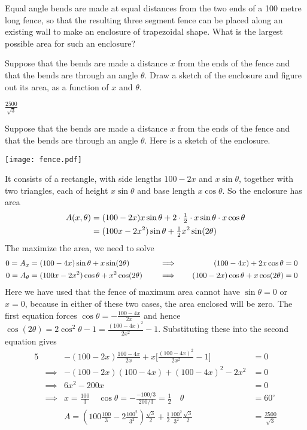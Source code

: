 \begin{question}
Equal angle bends are made at equal distances from the two ends of a
100 metre long fence, so that the resulting three segment fence can be placed
along an existing wall to make an enclosure of trapezoidal shape. What
is the largest possible area for such an enclosure?
\end{question}

\begin{hint}
Suppose that the bends are made a  distance $x$ from the ends of the fence
and that the bends are through an angle $\theta$. Draw a sketch of the
enclosure and figure out its area, as a function of $x$ and $\theta$.
\end{hint}

\begin{answer}
$\frac{2500}{\sqrt{3}}$
\end{answer}

\begin{solution}
Suppose that the bends are made a  distance $x$ from the ends of the fence
and that the bends are through an angle $\theta$.
Here is a sketch of the enclosure.
\begin{center}
     \texttt{[image: fence.pdf]}
\end{center}
It consists of a rectangle, with side lengths $100-2x$ and
$x\sin\theta$, together with two triangles, each of height $x\sin\theta$
and base length $x\cos\theta$. So the enclosure has area
\begin{align*}
A(x,\theta)&=(100-2x)x\sin\theta+2\cdot\tfrac{1}{2}\cdot x\sin\theta\cdot x\cos\theta\\
&=(100x-2x^2)\sin\theta+\tfrac{1}{2} x^2\sin(2\theta)
\end{align*}
The maximize the area, we need to solve
\begin{alignat*}{5}
0=A_x&=(100-4x)\sin\theta+x\sin(2\theta) & &\implies &
(100-4x)+2x\cos\theta&=0\cr
0=A_\theta&=(100x-2x^2)\cos\theta+x^2\cos(2\theta)\quad & &\implies\quad &
(100-2x)\cos\theta+x\cos(2\theta)&=0
\end{alignat*}
Here we have used that the fence of maximum area cannot have $\sin\theta=0$
or $x=0$, because in either of these two cases, the area enclosed will be zero. 
The first equation forces $\cos\theta=-\frac{100-4x}{2x}$
and hence $\cos(2\theta)=2\cos^2\theta-1=\frac{(100-4x)^2}{2x^2}-1$. 
Substituting these into the second equation gives
\begin{alignat*}{5}
& & -(100-2x)\frac{100-4x}{2x}+x\Big[\frac{(100-4x)^2}{2x^2}-1\Big]&=0 \\
&\implies & -(100-2x)(100-4x)+(100-4x)^2-2x^2&=0 \\
&\implies & 6x^2-200x&=0 \\
&\implies & x=\frac{100}{3}
\quad\cos\theta=-\frac{-100/3}{200/3}=\frac{1}{2}\quad
\theta&=60^\circ\\
& & A= \left(100\frac{100}{3}-2\frac{100^2}{3^2}\right)
             \frac{\sqrt{3}}{2}+\frac{1}{2} \frac{100^2}{3^2}\frac{\sqrt{3}}{2}
&=\frac{2500}{\sqrt{3}}
\end{alignat*}
\end{solution}


